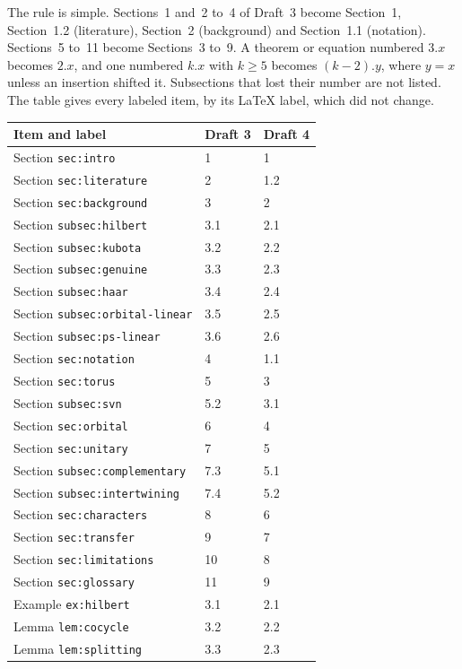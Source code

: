 \documentclass[12pt,letterpaper]{article}
\begin{document}
The rule is simple. Sections~1 and~2 to~4 of Draft~3 become
Section~1, Section~1.2 (literature), Section~2 (background) and
Section~1.1 (notation). Sections~5 to~11 become Sections~3 to~9. A
theorem or equation numbered $3.x$ becomes $2.x$, and one numbered
$k.x$ with $k\ge5$ becomes $(k-2).y$, where $y=x$ unless an insertion
shifted it. Subsections that lost their number are not listed. The
table gives every labeled item, by its \LaTeX{} label, which did not
change.

\clearpage
{\footnotesize
\begin{longtable}{@{}lll@{}}
\toprule
Item and label & Draft 3 & Draft 4\\
\midrule
\endhead
Section \texttt{sec:intro} & 1 & 1\\
Section \texttt{sec:literature} & 2 & 1.2\\
Section \texttt{sec:background} & 3 & 2\\
Section \texttt{subsec:hilbert} & 3.1 & 2.1\\
Section \texttt{subsec:kubota} & 3.2 & 2.2\\
Section \texttt{subsec:genuine} & 3.3 & 2.3\\
Section \texttt{subsec:haar} & 3.4 & 2.4\\
Section \texttt{subsec:orbital-linear} & 3.5 & 2.5\\
Section \texttt{subsec:ps-linear} & 3.6 & 2.6\\
Section \texttt{sec:notation} & 4 & 1.1\\
Section \texttt{sec:torus} & 5 & 3\\
Section \texttt{subsec:svn} & 5.2 & 3.1\\
Section \texttt{sec:orbital} & 6 & 4\\
Section \texttt{sec:unitary} & 7 & 5\\
Section \texttt{subsec:complementary} & 7.3 & 5.1\\
Section \texttt{subsec:intertwining} & 7.4 & 5.2\\
Section \texttt{sec:characters} & 8 & 6\\
Section \texttt{sec:transfer} & 9 & 7\\
Section \texttt{sec:limitations} & 10 & 8\\
Section \texttt{sec:glossary} & 11 & 9\\
Example \texttt{ex:hilbert} & 3.1 & 2.1\\
Lemma \texttt{lem:cocycle} & 3.2 & 2.2\\
Lemma \texttt{lem:splitting} & 3.3 & 2.3\\

\end{longtable}}
\end{document}
